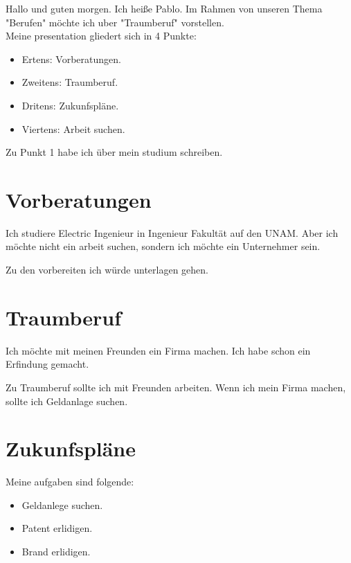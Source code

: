 \documentclass{article}
\begin{document}
Hallo und guten morgen. Ich hei\ss e Pablo. Im Rahmen von unseren Thema "Berufen" möchte ich uber "Traumberuf" vorstellen.\\

Meine presentation gliedert sich in 4 Punkte:\\


\begin{itemize}

\item Ertens: Vorberatungen.
\item Zweitens: Traumberuf.
\item Dritens: Zukunfspläne.
\item Viertens: Arbeit suchen.

\end{itemize}

Zu Punkt 1 habe ich über mein studium schreiben. 


\section{Vorberatungen}

Ich studiere Electric Ingenieur in Ingenieur Fakultät auf den UNAM. Aber ich möchte nicht ein arbeit suchen, sondern ich möchte ein Unternehmer sein.

Zu den vorbereiten ich würde unterlagen gehen.




\section{Traumberuf}



Ich möchte mit meinen Freunden ein Firma machen.
Ich habe schon ein Erfindung gemacht.

Zu Traumberuf sollte ich mit Freunden arbeiten. Wenn ich mein Firma machen, sollte ich  Geldanlage suchen.\\


\section{Zukunfspläne}

Meine aufgaben sind folgende:

\begin{itemize}
  \item Geldanlege suchen.
  \item Patent erlidigen.
  \item Brand erlidigen.
\end{itemize}
\end{document}

